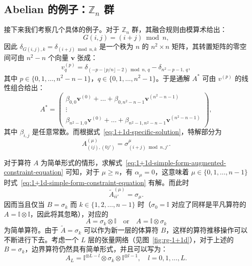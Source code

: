 \subsection{Abelian 的例子：\texorpdfstring{$\mathbb{Z}_n$}{ℤₙ} 群}

接下来我们考察几个具体的例子。对于 $\mathbb{Z}_n$ 群，其融合规则由模算术给出：
\begin{equation}
  G(i,j) = (i+j)\bmod n,
  \label{eq:Z_n-fusion-rules}
\end{equation}
因此 $\delta_{G(i,j),k}=\delta_{(i+j)\bmod n,k}$ 是一个秩为 $n$ 的 $n^2\times n$ 矩阵，其转置矩阵的零空间可由 $n^2-n$ 个向量 $\bm{v}$ 张成：
\begin{equation}
  v^{(p)}_q = \delta_{(-p-\lfloor p/n\rfloor-2)\bmod n, \, q} - \delta_{n^2-p-1, \, q},
\end{equation}
其中 $p\in\{0,1,\dots,n^2-n-1\}$，$q\in\{0,1,\dots,n^2-1\}$。于是通解 $A^*$ 可由 $v^{(p)}$ 的线性组合给出：
\begin{equation}
  A^* = \begin{pmatrix}
    \beta_{0,0} \bm{v}^{(0)} + \dots + \beta_{0,n^2-n-1} \bm{v}^{(n^2-n-1)} \\
    \vdots \\
    \beta_{n^2-1,0} \bm{v}^{(0)} + \dots + \beta_{n^2-1,n^2-n-1} \bm{v}^{(n^2-n-1)}
  \end{pmatrix},
\end{equation}
其中 $\beta_{i,j}$ 是任意常数。而根据式~\eqref{eq:1+1d-specific-solution}，特解部分为
\begin{equation}
  A^{(\mu)}_{(ij), (0j')} = \sigma^\mu_{(i+j)\bmod n, j'}.
\end{equation}

对于算符 $A$ 为简单形式的情形，求解式~\eqref{eq:1+1d-simple-form-augmented-constraint-equation} 可知，对于 $\mu\geqslant n$，有 $\alpha_\mu=0$，这意味着 $\mu\in\{0,1,\dots,n-1\}$ 时式~\eqref{eq:1+1d-simple-form-constraint-equation} 有解。而此时
\begin{equation}
  \tilde{A}^{(\mu)}_{ii'} = \sigma_\mu.
\end{equation}
因而当且仅当 $B=\sigma_k$ 而 $k\in\{1,2,\dots,n-1\}$ 时（$\sigma_0=\mathbb{I}$ 对应了同样是平凡算符的 $A=\mathbb{I}\otimes\mathbb{I}$，因此将其忽略），对应的
\begin{equation}
  A = \sigma_k   \otimes \mathbb{I} \quad \text{or} \quad
  A = \mathbb{I} \otimes \sigma_k
\end{equation}
为简单算符。由于 $\tilde{A}=\sigma_k$ 可以作为新一层的体算符 $B$，这样的算符推移操作可以不断进行下去。考虑一个 $L$ 层的张量网络（见图~\ref{fig:rg-1+1d}），对于上述的 $B=\sigma_k$，边界算符仍然具有简单形式，并且可以写为：
\begin{equation}
  A_L = \mathbb{I}^{\otimes L-l} \otimes \sigma_k \otimes \mathbb{I}^{\otimes l-1}, \quad l = 0,1,\dots,L.
\end{equation}

